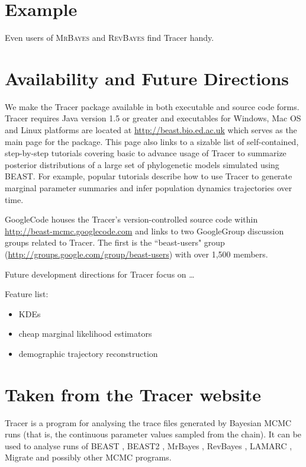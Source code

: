 \documentclass{bioinfo}
\begin{document}
\section*{Example}

Even users of \textsc{MrBayes} and \textsc{RevBayes} find Tracer handy.  

\section*{Availability and Future Directions}

We make the Tracer package available in both executable and source code forms.   Tracer requires Java version 1.5 or greater and executables for Windows, Mac OS and Linux platforms are located at \url{http://beast.bio.ed.ac.uk} which serves as the main page for the package. This page also links to a sizable list of self-contained, step-by-step tutorials covering basic to advance usage of Tracer to summarize posterior distributions of a large set of phylogenetic models simulated using BEAST.  For example, popular tutorials describe how to use Tracer to generate marginal parameter summaries and infer population dynamics trajectories over time.

GoogleCode houses the Tracer's version-controlled source code within \url{http://beast-mcmc.googlecode.com} and links to two GoogleGroup discussion groups related to Tracer.  
The first is the ``beast-users" group (\url{http://groups.google.com/group/beast-users}) with over 1,500 members. 

Future development directions for Tracer focus on \ldots


Feature list:
\begin{itemize}
\item KDEs
\item cheap marginal likelihood estimators
\item demographic trajectory reconstruction
\end{itemize}

\section*{Taken from the Tracer website}

Tracer is a program for analysing the trace files generated by Bayesian MCMC runs (that is, the continuous parameter values sampled from the chain). It can be used to analyse runs of BEAST \citep{drummond2007beast,drummond2012bayesian}, BEAST2 \citep{bouckaert2014beast2}, MrBayes \citep{ronquist2012mrbayes}, RevBayes \citep{hohna2016revbayes}, LAMARC \citep{kuhner2006lamarc}, Migrate \citep{beerli2006comparison} and possibly other MCMC programs.
\end{document}
